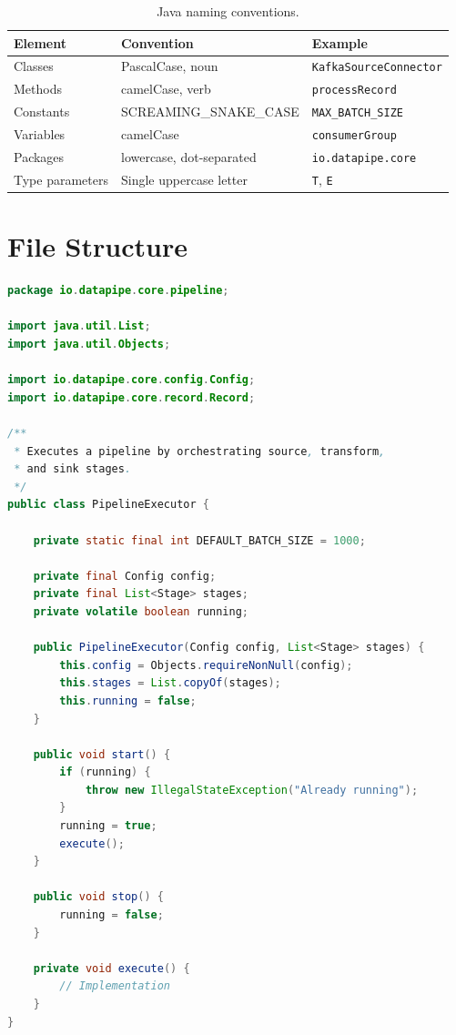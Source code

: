 \documentclass[
    language=english,
    doctype=standard,
    institution=none,
    titlestyle=book,
    oneside,
]{../../omnilatex}
\begin{document}
\begin{table}[htbp]
    \centering
    \caption{Java naming conventions.}
    \label{tab:java-naming}
    \begin{tabular}{@{}lp{5cm}p{5cm}@{}}
        \toprule
        Element & Convention & Example \\
        \midrule
        Classes & PascalCase, noun & \texttt{KafkaSourceConnector} \\
        Methods & camelCase, verb & \texttt{processRecord} \\
        Constants & SCREAMING\_SNAKE\_CASE & \texttt{MAX\_BATCH\_SIZE} \\
        Variables & camelCase & \texttt{consumerGroup} \\
        Packages & lowercase, dot-separated & \texttt{io.datapipe.core} \\
        Type parameters & Single uppercase letter & \texttt{T}, \texttt{E} \\
        \bottomrule
    \end{tabular}
\end{table}

\section{File Structure}

\begin{lstlisting}[language=java, caption={Standard Java class structure.}]
package io.datapipe.core.pipeline;

import java.util.List;
import java.util.Objects;

import io.datapipe.core.config.Config;
import io.datapipe.core.record.Record;

/**
 * Executes a pipeline by orchestrating source, transform,
 * and sink stages.
 */
public class PipelineExecutor {

    private static final int DEFAULT_BATCH_SIZE = 1000;

    private final Config config;
    private final List<Stage> stages;
    private volatile boolean running;

    public PipelineExecutor(Config config, List<Stage> stages) {
        this.config = Objects.requireNonNull(config);
        this.stages = List.copyOf(stages);
        this.running = false;
    }

    public void start() {
        if (running) {
            throw new IllegalStateException("Already running");
        }
        running = true;
        execute();
    }

    public void stop() {
        running = false;
    }

    private void execute() {
        // Implementation
    }
}
\end{lstlisting}
\end{document}
